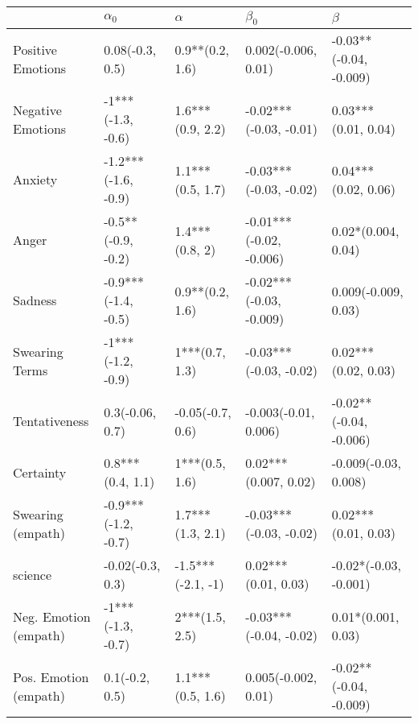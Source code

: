 \begin{tabular}{lllll}
\toprule
{} &           $\alpha_0$ &           $\alpha$ &                $\beta_0$ &                 $\beta$ \\
\midrule
Positive Emotions     &      0.08(-0.3, 0.5) &    0.9**(0.2, 1.6) &      0.002(-0.006, 0.01) &  -0.03**(-0.04, -0.009) \\
Negative Emotions     &    -1***(-1.3, -0.6) &   1.6***(0.9, 2.2) &   -0.02***(-0.03, -0.01) &     0.03***(0.01, 0.04) \\
Anxiety               &  -1.2***(-1.6, -0.9) &   1.1***(0.5, 1.7) &   -0.03***(-0.03, -0.02) &     0.04***(0.02, 0.06) \\
Anger                 &   -0.5**(-0.9, -0.2) &     1.4***(0.8, 2) &  -0.01***(-0.02, -0.006) &      0.02*(0.004, 0.04) \\
Sadness               &  -0.9***(-1.4, -0.5) &    0.9**(0.2, 1.6) &  -0.02***(-0.03, -0.009) &     0.009(-0.009, 0.03) \\
Swearing Terms        &    -1***(-1.2, -0.9) &     1***(0.7, 1.3) &   -0.03***(-0.03, -0.02) &     0.02***(0.02, 0.03) \\
Tentativeness         &      0.3(-0.06, 0.7) &   -0.05(-0.7, 0.6) &     -0.003(-0.01, 0.006) &  -0.02**(-0.04, -0.006) \\
Certainty             &     0.8***(0.4, 1.1) &     1***(0.5, 1.6) &     0.02***(0.007, 0.02) &    -0.009(-0.03, 0.008) \\
Swearing (empath)     &  -0.9***(-1.2, -0.7) &   1.7***(1.3, 2.1) &   -0.03***(-0.03, -0.02) &     0.02***(0.01, 0.03) \\
science               &     -0.02(-0.3, 0.3) &  -1.5***(-2.1, -1) &      0.02***(0.01, 0.03) &   -0.02*(-0.03, -0.001) \\
Neg. Emotion (empath) &    -1***(-1.3, -0.7) &     2***(1.5, 2.5) &   -0.03***(-0.04, -0.02) &      0.01*(0.001, 0.03) \\
Pos. Emotion (empath) &       0.1(-0.2, 0.5) &   1.1***(0.5, 1.6) &      0.005(-0.002, 0.01) &  -0.02**(-0.04, -0.009) \\
\bottomrule
\end{tabular}
